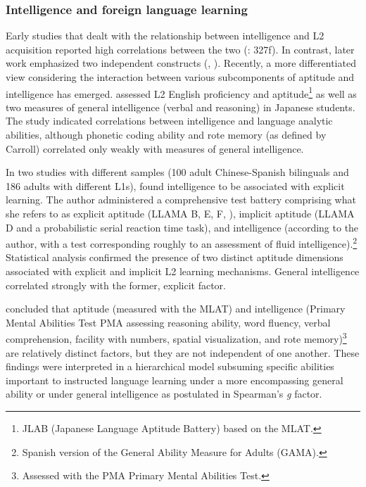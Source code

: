 \documentclass[output=paper]{langscibook}
\begin{document}
\subsubsection{Intelligence and foreign language learning} %

Early studies that dealt with the relationship between intelligence and L2 acquisition reported high correlations between the two (\citealt{Spolsky1995}: 327f). In contrast, later work emphasized two independent constructs (\citealt{GardnerLambert1965}, \citealt{Skehan1986}). Recently, a more differentiated view considering the interaction between various subcomponents of aptitude and intelligence has emerged. \citet{Sasaki1996} assessed L2 English proficiency and aptitude\footnote{JLAB (Japanese Language Aptitude Battery) based on the MLAT.} as well as two measures of general intelligence (verbal and reasoning) in Japanese students. The study indicated correlations between intelligence and language analytic abilities, although phonetic coding ability and rote memory (as defined by Carroll) correlated only weakly with measures of general intelligence. 

In two studies with different samples (100 adult Chinese-Spanish bilinguals and 186 adults with different L1s), \citet{Granena2012,Granena2013} found intelligence to be associated with explicit learning. The author administered a comprehensive test battery comprising what she refers to as explicit aptitude (LLAMA B, E, F, \citealt{MearaEtAl2001}), implicit aptitude (LLAMA D and a probabilistic serial reaction time task), and intelligence (according to the author, with a test corresponding roughly to an assessment of fluid intelligence).\footnote{Spanish version of the General Ability Measure for Adults (GAMA).} Statistical analysis confirmed the presence of two distinct aptitude dimensions associated with explicit and implicit L2 learning mechanisms. General intelligence correlated strongly with the former, explicit factor.

\citet{WescheEtAl1982} concluded that aptitude (measured with the MLAT) and intelligence (Primary Mental Abilities Test PMA assessing reasoning ability, word fluency, verbal comprehension, facility with numbers, spatial visualization, and rote memory)\footnote{Assessed with the PMA Primary Mental Abilities Test.} are relatively distinct factors, but they are not independent of one another. These findings were interpreted in a hierarchical model subsuming specific abilities important to instructed language learning under a more encompassing general ability or under general intelligence as postulated in Spearman’s \textit{g} factor. 
\end{document}
